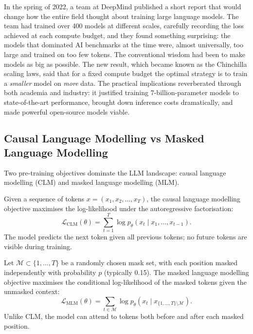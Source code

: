 \begin{deepdive}
In the spring of 2022, a team at DeepMind published a short report that would
change how the entire field thought about training large language models.
The team had trained over 400 models at different scales, carefully recording
the loss achieved at each compute budget, and they found something surprising:
the models that dominated AI benchmarks at the time were, almost universally,
too large and trained on too few tokens.  The conventional wisdom had been to
make models as big as possible.  The new result, which became known as the
Chinchilla scaling laws, said that for a fixed compute budget the optimal
strategy is to train a \emph{smaller} model on \emph{more} data.  The practical
implications reverberated through both academia and industry: it justified
training 7-billion-parameter models to state-of-the-art performance, brought
down inference costs dramatically, and made powerful open-source models viable.

\subsection{Causal Language Modelling vs Masked Language Modelling}
\label{subsec:lm-objectives}

Two pre-training objectives dominate the LLM landscape: causal language
modelling (CLM) and masked language modelling (MLM).

\begin{definition}
\label{def:clm}
Given a sequence of tokens $x = (x_1, x_2, \ldots, x_T)$, the causal language
modelling objective maximises the log-likelihood under the autoregressive
factorisation:
\begin{equation}
  \mathcal{L}_{\mathrm{CLM}}(\theta) = \sum_{t=1}^{T} \log p_\theta(x_t \mid x_1, \ldots, x_{t-1}).
  \label{eq:clm}
\end{equation}
The model predicts the next token given all previous tokens; no future tokens
are visible during training.
\end{definition}

\begin{definition}
\label{def:mlm}
Let $\mathcal{M} \subset \{1, \ldots, T\}$ be a randomly chosen mask set,
with each position masked independently with probability $p$ (typically 0.15).
The masked language modelling objective maximises the conditional log-likelihood
of the masked tokens given the unmasked context:
\begin{equation}
  \mathcal{L}_{\mathrm{MLM}}(\theta) = \sum_{t \in \mathcal{M}} \log p_\theta(x_t \mid x_{\{1,\ldots,T\} \setminus \mathcal{M}}).
  \label{eq:mlm}
\end{equation}
Unlike CLM, the model can attend to tokens both before and after each masked
position.
\end{definition}


\end{deepdive}
